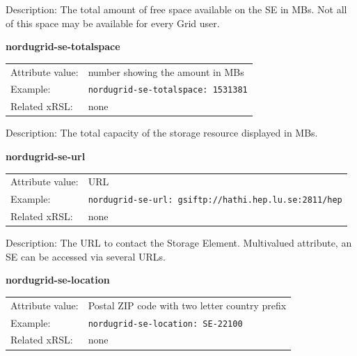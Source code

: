 \documentclass{article}
\begin{document}
Description: The total amount of free space available on the SE in MBs.
Not all of this space may be available for every Grid user.


  \hspace*{0.5cm}
  \begin{shaded}
    \textbf{nordugrid-se-totalspace}
  \end{shaded}
  \begin{tabular}{lp{10cm}}  
    Attribute value:& number showing the amount in MBs\\
    Example:& \verb#nordugrid-se-totalspace: 1531381#\\
    Related xRSL:& none\\
  \end{tabular}

Description:
The total capacity of the storage resource displayed in MBs.



  \hspace*{0.5cm}
  \begin{shaded}
    \textbf{nordugrid-se-url}
  \end{shaded}
  \begin{tabular}{lp{10cm}}  
    Attribute value:& URL\\
    Example:& \verb#nordugrid-se-url: gsiftp://hathi.hep.lu.se:2811/hep#\\
    Related xRSL:& none\\
  \end{tabular}

Description: The URL to contact the Storage Element.
Multivalued attribute, an SE can be accessed via several URLs.


  \hspace*{0.5cm}
  \begin{shaded}
    \textbf{nordugrid-se-location}
  \end{shaded}
  \begin{tabular}{lp{10cm}}  
    Attribute value:&  Postal ZIP code with two letter country prefix\\
    Example:& \verb#nordugrid-se-location: SE-22100#\\
    Related xRSL:& none\\
  \end{tabular}
\end{document}
